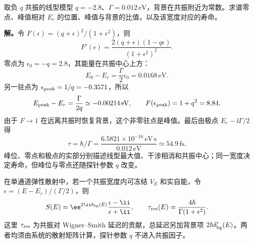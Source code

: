 \begin{exbox}
取负 $q$ 共振的线型模型 $q=-2.8$、$\Gamma=0.012\,\mathrm{eV}$，背景在共振附近为常数。求谱零点、峰值相对 $E_r$ 的位置、峰值与背景的比值，以及该宽度对应的寿命。

\textbf{解。}令 $F(\epsilon)=(q+\epsilon)^2/(1+\epsilon^2)$，则
\[
 F'(\epsilon)=\frac{2(q+\epsilon)(1-q\epsilon)}{(1+\epsilon^2)^2}.
\]
零点为 $\epsilon_0=-q=2.8$，其能量在共振中心上方：
\[
 E_0-E_r=\frac\Gamma2\epsilon_0=0.0168\,\mathrm{eV}.
\]
另一驻点为 $\epsilon_{\rm peak}=1/q=-0.3571$，所以
\[
 E_{\rm peak}-E_r=\frac\Gamma{2q}\simeq-0.00214\,\mathrm{eV},
 \qquad F(\epsilon_{\rm peak})=1+q^2=8.84.
\]
由于 $F\to1$ 在远离共振时恢复背景，这个非零驻点是峰值。最后由极点 $E_r-\ii\Gamma/2$ 得
\[
 \tau=\hbar/\Gamma
 =\frac{6.5821\times10^{-16}\,\mathrm{eV\,s}}{0.012\,\mathrm{eV}}
 \simeq54.9\,\mathrm{fs}.
\]
峰位、零点和极点的实部分别描述线型最大值、干涉相消和共振中心；同一宽度决定寿命，但峰位与零点还随探针参数 $q$ 改变。
\end{exbox}

\begin{proposition}[冻结宽度下的共振相位与延迟]
在单通道弹性散射中，若一个共振宽度内可冻结 $V_E$ 和实自能，令 $\epsilon=(E-E_r)/(\Gamma/2)$，则
\[
 S(E)=\ee^{2\ii\delta_{\rm bg}(E)}\frac{\epsilon-\ii}{\epsilon+\ii},
 \qquad
 \tau_{\rm res}(E)=\frac{4\hbar}{\Gamma(1+\epsilon^2)}.
\]
这里 $\tau_{\rm res}$ 为共振对 Wigner--Smith 延迟的贡献，总延迟另加背景项 $2\hbar\delta_{\rm bg}'(E)$。两者均须由系统的散射矩阵计算，探针参数 $q$ 不进入共振因子。
\end{proposition}

